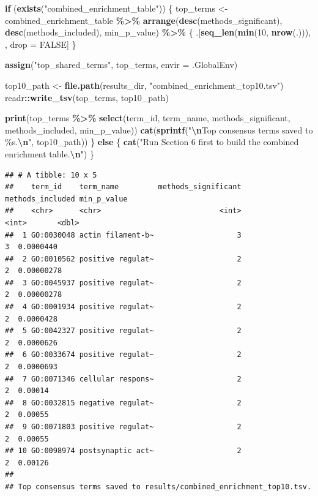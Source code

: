 \documentclass[
]{article}
\newenvironment{Shaded}{\begin{snugshade}}{\end{snugshade}}
\newcommand{\AttributeTok}[1]{\textcolor[rgb]{0.13,0.29,0.53}{#1}}
\newcommand{\ConstantTok}[1]{\textcolor[rgb]{0.56,0.35,0.01}{#1}}
\newcommand{\ControlFlowTok}[1]{\textcolor[rgb]{0.13,0.29,0.53}{\textbf{#1}}}
\newcommand{\DecValTok}[1]{\textcolor[rgb]{0.00,0.00,0.81}{#1}}
\newcommand{\FunctionTok}[1]{\textcolor[rgb]{0.13,0.29,0.53}{\textbf{#1}}}
\newcommand{\NormalTok}[1]{#1}
\newcommand{\OtherTok}[1]{\textcolor[rgb]{0.56,0.35,0.01}{#1}}
\newcommand{\SpecialCharTok}[1]{\textcolor[rgb]{0.81,0.36,0.00}{\textbf{#1}}}
\newcommand{\StringTok}[1]{\textcolor[rgb]{0.31,0.60,0.02}{#1}}
\begin{document}
\begin{Shaded}
\begin{Highlighting}[]
\ControlFlowTok{if}\NormalTok{ (}\FunctionTok{exists}\NormalTok{(}\StringTok{"combined\_enrichment\_table"}\NormalTok{)) \{}
\NormalTok{  top\_terms }\OtherTok{\textless{}{-}}\NormalTok{ combined\_enrichment\_table }\SpecialCharTok{\%\textgreater{}\%}
    \FunctionTok{arrange}\NormalTok{(}\FunctionTok{desc}\NormalTok{(methods\_significant), }\FunctionTok{desc}\NormalTok{(methods\_included), min\_p\_value) }\SpecialCharTok{\%\textgreater{}\%}
\NormalTok{    \{ .[}\FunctionTok{seq\_len}\NormalTok{(}\FunctionTok{min}\NormalTok{(}\DecValTok{10}\NormalTok{, }\FunctionTok{nrow}\NormalTok{(.))), , drop }\OtherTok{=} \ConstantTok{FALSE}\NormalTok{] \}}

  \FunctionTok{assign}\NormalTok{(}\StringTok{"top\_shared\_terms"}\NormalTok{, top\_terms, }\AttributeTok{envir =}\NormalTok{ .GlobalEnv)}

\NormalTok{  top10\_path }\OtherTok{\textless{}{-}} \FunctionTok{file.path}\NormalTok{(results\_dir, }\StringTok{"combined\_enrichment\_top10.tsv"}\NormalTok{)}
\NormalTok{  readr}\SpecialCharTok{::}\FunctionTok{write\_tsv}\NormalTok{(top\_terms, top10\_path)}

  \FunctionTok{print}\NormalTok{(top\_terms }\SpecialCharTok{\%\textgreater{}\%} \FunctionTok{select}\NormalTok{(term\_id, term\_name, methods\_significant, methods\_included, min\_p\_value))}
  \FunctionTok{cat}\NormalTok{(}\FunctionTok{sprintf}\NormalTok{(}\StringTok{"}\SpecialCharTok{\textbackslash{}n}\StringTok{Top consensus terms saved to \%s.}\SpecialCharTok{\textbackslash{}n}\StringTok{"}\NormalTok{, top10\_path))}
\NormalTok{\} }\ControlFlowTok{else}\NormalTok{ \{}
  \FunctionTok{cat}\NormalTok{(}\StringTok{"Run Section 6 first to build the combined enrichment table.}\SpecialCharTok{\textbackslash{}n}\StringTok{"}\NormalTok{)}
\NormalTok{\}}
\end{Highlighting}
\end{Shaded}

\begin{verbatim}
## # A tibble: 10 x 5
##    term_id    term_name         methods_significant methods_included min_p_value
##    <chr>      <chr>                           <int>            <int>       <dbl>
##  1 GO:0030048 actin filament-b~                   3                3  0.0000440 
##  2 GO:0010562 positive regulat~                   2                2  0.00000278
##  3 GO:0045937 positive regulat~                   2                2  0.00000278
##  4 GO:0001934 positive regulat~                   2                2  0.0000428 
##  5 GO:0042327 positive regulat~                   2                2  0.0000626 
##  6 GO:0033674 positive regulat~                   2                2  0.0000693 
##  7 GO:0071346 cellular respons~                   2                2  0.00014   
##  8 GO:0032815 negative regulat~                   2                2  0.00055   
##  9 GO:0071803 positive regulat~                   2                2  0.00055   
## 10 GO:0098974 postsynaptic act~                   2                2  0.00126   
## 
## Top consensus terms saved to results/combined_enrichment_top10.tsv.
\end{verbatim}
\end{document}

